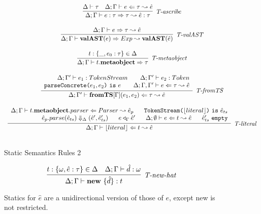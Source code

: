 \begin{figure}
\[\begin{array}{c}
\infer[\textit{T-ascribe}]
	{\Delta; \Gamma  \vdash  e:\tau \Rightarrow \tau \leadsto \hat{e}:\tau}
	{\Delta \vdash \tau & \Delta; \Gamma \vdash e \Leftarrow \tau \leadsto \hat{e} } \\[3ex]

\infer[\textit{T-valAST}]
        {\Delta; \Gamma \vdash \keyw{valAST}(e) \Rightarrow Exp \leadsto \keyw{valAST}(\hat{e}) }
	{\Delta; \Gamma \vdash e \Rightarrow \tau \leadsto \hat{e}} \\[3ex]

\infer[\textit{T-metaobject}]
        {\Delta; \Gamma \vdash t.\keyw{metaobject} \Rightarrow \tau   }
	{t:\{\_, e_0:\tau\} \in \Delta} \\[3ex]


\infer[\textit{T-fromTS}]
	  {\Delta; \Gamma' \vdash \keyw{fromTS}[\Gamma](e_1,e_2) \Leftarrow \tau \leadsto \hat{e} }
	  {\renewcommand{\arraystretch}{1}
	    \begin{array}{r}
	    \Delta;\Gamma' \vdash e_1:TokenStream ~~~~~~ \Delta;\Gamma' \vdash e_2:Token\\
            \texttt{parseConcrete(}e_1,e_2\texttt{)}\ \texttt{is}\ e ~~~~~~\Delta; \Gamma, \Gamma' \vdash e \Leftarrow \tau \leadsto \hat{e}
            \end{array}
       } \\[3ex]  

\infer[\textit{T-literal}]
	  {\Delta; \Gamma \vdash \lfloor literal \rfloor \Leftarrow t \leadsto \hat{e} }
	  {\renewcommand{\arraystretch}{1}
	    \begin{array}{r}
	    \Delta;\Gamma \vdash t.\keyw{metaobject}.parser\Leftarrow Parser \leadsto \hat{e}_p ~~~~~ \texttt{TokenStream(}\lfloor literal \rfloor \texttt{)}\ \texttt{is}\ \hat{e}_{ts}\\
            \hat{e}_p.parse(\hat{e}_{ts}) \Downarrow_{\Delta} (\hat{e}', \hat e_{ts}') ~~~~~  e \triangleleft_\Gamma \hat{e}'~~~~~ \Delta;\emptyset\vdash e\Leftarrow t \leadsto \hat{e} ~~~~~ \hat e_{ts}'\ \texttt{empty}
            \end{array}
       } \\[3ex]   
\end{array}
\]
\label{fig:statics2}
\caption{Static Semantics Rules 2}
\end{figure}

\begin{figure}
\centering
\[
\infer[\textit{T-new-hat}]
	{\Delta; \Gamma \vdash \keyw{new}\ \{ \hat d \} :  t }
	{ t:\{\omega, \hat e:\tau\} \in \Delta & \Delta;\Gamma \vdash \hat d : \omega}
\]
\caption{Statics for $\hat e$ are a unidirectional version of those of $e$, except new is not restricted.}
\label{fig:staticsHat}
\end{figure}


